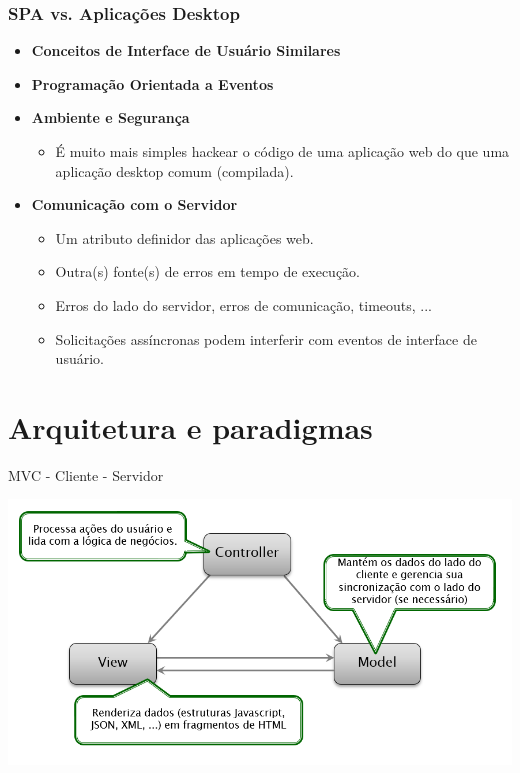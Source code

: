 \documentclass{beamer}
\begin{document}
\begin{frame}
      \frametitle{SPA vs. Aplicações Desktop}

      \begin{itemize}
            \item \textbf{Conceitos de Interface de Usuário Similares}

            \item \textbf{Programação Orientada a Eventos}

            \item \textbf{Ambiente e Segurança}
                  \begin{itemize}
                        \item É muito mais simples hackear o código de uma aplicação web do que uma aplicação desktop comum (compilada).
                  \end{itemize}

            \item \textbf{Comunicação com o Servidor}
                  \begin{itemize}
                        \item Um atributo definidor das aplicações web.
                        \item Outra(s) fonte(s) de erros em tempo de execução.
                        \item Erros do lado do servidor, erros de comunicação, timeouts, ...
                        \item Solicitações assíncronas podem interferir com eventos de interface de usuário.
                  \end{itemize}
      \end{itemize}

\end{frame}

\section{Arquitetura e paradigmas}

\begin{frame}{MVC - Cliente - Servidor}

      \begin{center}
            \includegraphics[width=0.8\linewidth]{assets/aula-tads-pdwa5/mv-client-side.png}
      \end{center}
\end{frame}
\end{document}
